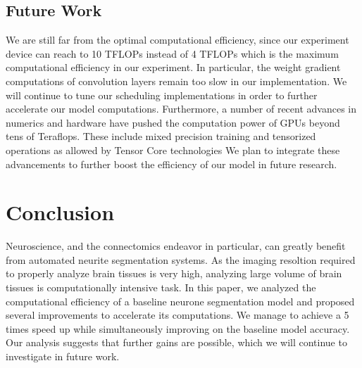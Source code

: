 \documentclass[runningheads]{llncs}
\begin{document}
\subsection{Future Work}

We are still far from the optimal computational efficiency, 
since our experiment device can reach to 10 TFLOPs instead of 4 TFLOPs which is the maximum computational efficiency in our experiment.
In particular, the weight gradient computations of convolution layers remain too slow in our implementation.
We will continue to tune our scheduling implementations in order to further accelerate our model computations.
Furthermore, a number of recent advances in numerics and hardware have pushed the computation 
power of GPUs beyond tens of Teraflops.
These include mixed precision training and tensorized operations as allowed by Tensor Core technologies
We plan to integrate these advancements to further boost the efficiency of our model in future research.

\section{Conclusion}

Neuroscience, and the connectomics endeavor in particular, can greatly benefit from automated neurite segmentation systems.
As the imaging resoltion required to properly analyze brain tissues is very high, analyzing large volume of brain tissues is computationally intensive task.
In this paper, we analyzed the computational efficiency of a baseline neurone segmentation model and proposed several improvements to accelerate its computations.
We manage to achieve a 5 times speed up while simultaneously improving on the baseline model accuracy.
Our analysis suggests that further gains are possible, which we will continue to investigate in future work.
%


%



%





%

%
%
%
%
%
%

%
\end{document}
